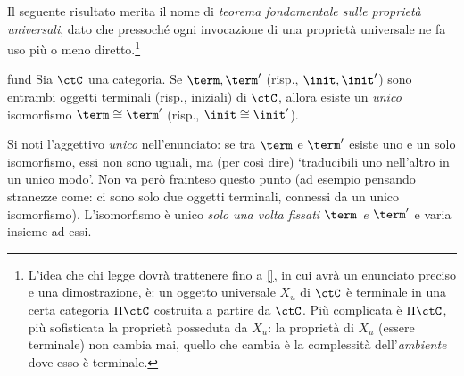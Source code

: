 


Il seguente risultato merita il nome di \emph{teorema fondamentale sulle proprietà universali}, dato che pressoché ogni invocazione di una proprietà universale ne fa uso più o meno diretto.\footnote{L'idea che chi legge dovrà trattenere fino a \ref{}, in cui avrà un enunciato preciso e una dimostrazione, è: un oggetto universale \(X_u\) di \(\ctC\) è terminale in una certa categoria \(\Pi\ctC\) costruita a partire da \(\ctC\). Più complicata è \(\Pi\ctC\), più sofisticata la proprietà posseduta da \(X_u\): la proprietà di \(X_u\) (essere terminale) non cambia mai, quello che cambia è la complessità dell'\emph{ambiente} dove esso è terminale.}
\begin{hProposition}[TFPU]{fund}\label{tfpu}
	Sia \(\ctC\) una categoria. Se \(\term,\term'\) (risp., \(\init,\init'\)) sono entrambi oggetti terminali (risp., iniziali) di \(\ctC\), allora esiste un \emph{unico} isomorfismo \(\term\cong\term'\) (risp., \(\init\cong \init'\)).
\end{hProposition}
Si noti l'aggettivo \emph{unico} nell'enunciato: se tra \(\term\) e \(\term'\) esiste uno e un solo isomorfismo, essi non sono uguali, ma (per così dire) `traducibili uno nell'altro in un unico modo'. Non va però frainteso questo punto (ad esempio pensando stranezze come: ci sono solo due oggetti terminali, connessi da un unico isomorfismo). L'isomorfismo è unico \emph{solo una volta fissati \(\term\) e \(\term'\)} e varia insieme ad essi.

